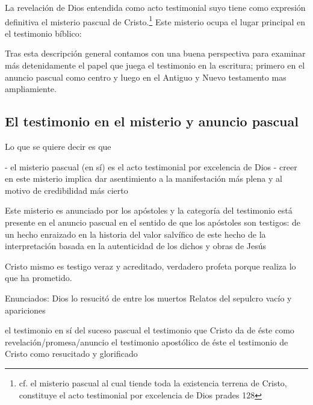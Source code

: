 La revelación de Dios entendida como acto testimonial suyo tiene como expresión
definitiva el misterio pascual de Cristo.\footnote{cf. el misterio pascual al
  cual tiende toda la existencia terrena de Cristo, constituye el acto
  testimonial por excelencia de Dios prades 128} Este misterio ocupa el lugar
principal en el testimonio bíblico:

Tras esta descripción general contamos con una buena perspectiva para examinar
más detenidamente el papel que juega el testimonio en la escritura; primero en
el anuncio pascual como centro y luego en el Antiguo y Nuevo testamento mas
ampliamiente.

\subsection{El testimonio en el misterio y anuncio pascual}
Lo que se quiere decir es que

- el misterio pascual (en sí) es el acto testimonial por excelencia de Dios
- creer en este misterio implica dar asentimiento a la manifestación más plena y
al motivo de credibilidad más cierto

Este misterio es anunciado por los apóstoles y
la categoría del testimonio está presente en el
anuncio pascual en el sentido de que los apóstoles son testigos:
de un hecho enraizado en la historia
del valor salvífico de este hecho
de la interpretación basada en la autenticidad de los dichos y obras de Jesús

Cristo mismo es testigo veraz y acreditado, verdadero profeta porque realiza lo
que ha prometido.

Enunciados:
Dios lo resucitó de entre los muertos
Relatos del sepulcro vacío y apariciones


el testimonio en sí del suceso pascual
el testimonio que Cristo da de éste como revelación/promesa/anuncio
el testimonio apostólico de éste
el testimonio de Cristo como resucitado y glorificado


